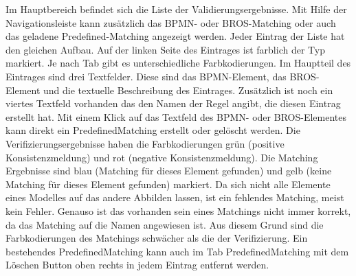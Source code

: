 Im Hauptbereich befindet sich die Liste der Validierungsergebnisse.
Mit Hilfe der Navigationsleiste kann zusätzlich das BPMN- oder BROS-Matching oder auch das geladene Predefined-Matching angezeigt werden.
Jeder Eintrag der Liste hat den gleichen Aufbau.
Auf der linken Seite des Eintrages ist farblich der Typ markiert. Je nach Tab gibt es unterschiedliche Farbkodierungen.
Im Hauptteil des Eintrages sind drei Textfelder.
Diese sind das BPMN-Element, das BROS-Element und die textuelle Beschreibung des Eintrages.
Zusätzlich ist noch ein viertes Textfeld vorhanden das den Namen der Regel angibt, die diesen Eintrag erstellt hat.
Mit einem Klick auf das Textfeld des BPMN- oder BROS-Elementes kann direkt ein PredefinedMatching erstellt oder gelöscht werden.
Die Verifizierungsergebnisse haben die Farbkodierungen grün (positive Konsistenzmeldung) und rot (negative Konsistenzmeldung).
Die Matching Ergebnisse sind blau (Matching für dieses Element gefunden) und gelb (keine Matching für dieses Element gefunden) markiert.
Da sich nicht alle Elemente eines Modelles auf das andere Abbilden lassen, ist ein fehlendes Matching, meist kein Fehler.
Genauso ist das vorhanden sein eines Matchings nicht immer korrekt, da das Matching auf die Namen angewiesen ist. 
Aus diesem Grund sind die Farbkodierungen des Matchings schwächer als die der Verifizierung.
Ein bestehendes PredefinedMatching kann auch im Tab PredefinedMatching mit dem Löschen Button oben rechts in jedem Eintrag entfernt werden.
